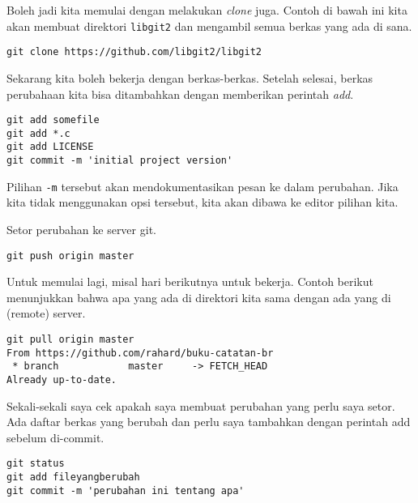 Boleh jadi kita memulai dengan melakukan {\em clone} juga.
Contoh di bawah ini kita akan membuat direktori \texttt{libgit2}
dan mengambil semua berkas yang ada di sana.
\begin{lstlisting}
git clone https://github.com/libgit2/libgit2
\end{lstlisting}

Sekarang kita boleh bekerja dengan berkas-berkas.
Setelah selesai, berkas perubahaan kita bisa ditambahkan
dengan memberikan perintah {\em add}.

\begin{lstlisting}
git add somefile
git add *.c
git add LICENSE
git commit -m 'initial project version'
\end{lstlisting}
Pilihan \texttt{-m} tersebut akan mendokumentasikan pesan ke dalam
perubahan. Jika kita tidak menggunakan opsi tersebut, kita akan
dibawa ke editor pilihan kita.

Setor perubahan ke server git.

\begin{lstlisting}
git push origin master
\end{lstlisting}

Untuk memulai lagi, misal hari berikutnya untuk bekerja.
Contoh berikut menunjukkan bahwa apa yang ada di direktori kita
sama dengan ada yang di (remote) server.
\begin{lstlisting}
git pull origin master
From https://github.com/rahard/buku-catatan-br
 * branch            master     -> FETCH_HEAD
Already up-to-date.
\end{lstlisting}

Sekali-sekali saya cek apakah saya membuat perubahan yang perlu
saya setor. Ada daftar berkas yang berubah dan perlu saya
tambahkan dengan perintah add sebelum di-commit.
\begin{lstlisting}
git status
git add fileyangberubah
git commit -m 'perubahan ini tentang apa'
\end{lstlisting}
